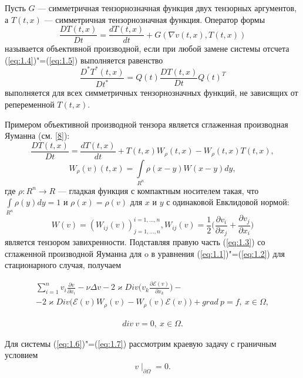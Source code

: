 \begin{definition}
    Пусть $G$ --- симметричная тензорнозначная функция двух тензорных аргументов, а $T(t, x)$ --- симметричная 
    тензорнозначная функция. Оператор формы
    $$\frac{DT(t,x)}{Dt}=\frac{dT(t,x)}{dt}+G(\nabla v(t,x),T(t,x))$$
    называется объективной производной, если при любой замене системы отсчета (\ref{eq:1.4})"=(\ref{eq:1.5}) выполняется 
    равенство
    $$\frac{D^*T^*(t,x)}{Dt^*}=Q(t)\frac{DT(t,x)}{Dt}Q(t)^T$$
    выполняется для всех симметричных тензорнозначных функций, не зависящих от репеременной $T(t, x)$. 
\end{definition}

Примером объективной производной тензора является сглаженная производная Яуманна (см. \hyperlink{L8}{[8]}):
$$\frac{DT(t,x)}{Dt}=\frac{dT(t,x)}{dt}+T(t,x)W_{\rho}(t,x)-W_{\rho}(t,x)T(t,x), $$
$$W_{\rho}(v)(t,x)=\int\limits_{R^n}{\rho}(x-y)W(x-y)dy,$$
где $\rho: R^n\rightarrow R$ --- гладкая функция с компактным носителем такая, что $\int\limits_{R^n}\rho (y) dy = 1$
и $\rho(x) = \rho(v)$ для $x$ и $y$ с одинаковой Евклидовой нормой:
$$W(v)=(W_{ij}(v))^{i=1,...,n}_{j=1,...,n}, W_{ij}(v)=\frac{1}{2}\bigg(\frac{\partial v_i}{\partial x_j}+\frac{\partial v_j}{\partial x_i}\bigg)$$
является тензором завихренности. 
Подставляя правую часть (\ref{eq:1.3}) со сглаженной производной Яуманна для o в уравнения (\ref{eq:1.1})"=(\ref{eq:1.2}) для 
стационарного случая, получаем

\begin{equation}\label{eq:1.6}
    \begin{gathered}
        \sum_{i=1}^n v_i\frac{\partial v}{\partial x_i}-\nu\Delta v- 2\varkappa Div\bigg(v_k\frac{\partial\mathcal{E}(v)}
        {\partial x_k}\bigg)-\\-2\varkappa Div\bigg(\mathcal{E}(v)W_{\rho}(v)-W_{\rho}(v)\mathcal{E}(v)\bigg)+grad \ p=f, \ x\in\Omega,
    \end{gathered}
\end{equation}

\begin{equation}\label{eq:1.7}
    \begin{gathered}
        div \ v=0, \ x\in\Omega.
    \end{gathered}
\end{equation}

Для системы (\ref{eq:1.6})"=(\ref{eq:1.7}) рассмотрим краевую задачу с граничным условием
\begin{equation}\label{eq:1.8}
     \begin{gathered}
         v\mid_{\partial\Omega}=0.
     \end{gathered}
\end{equation}

